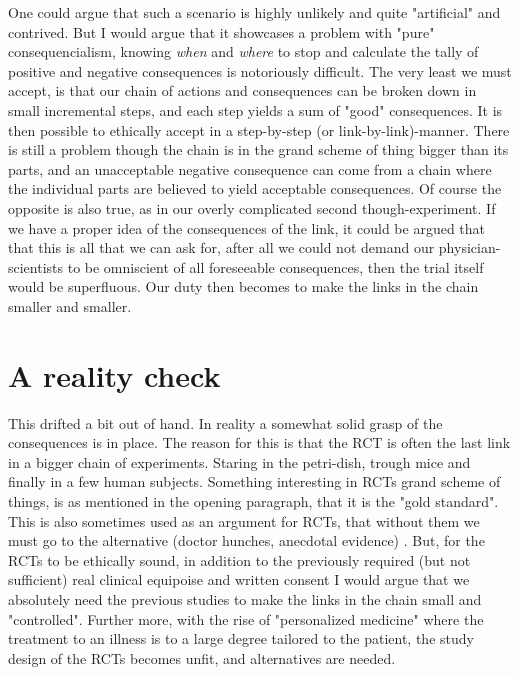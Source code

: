 \documentclass[12p]{article}
\begin{document}
One could argue that such a scenario is highly unlikely and quite "artificial" and contrived. %
But I would argue that it showcases a problem with "pure" consequencialism, knowing \emph{when} and \emph{where} to stop and calculate the tally of positive and negative consequences is notoriously difficult.
The very least we must accept, is that our chain of actions and consequences can be broken down in small incremental steps, and each step yields a sum of "good" consequences.
It is then possible to ethically accept in a step-by-step (or link-by-link)-manner.
There is still a problem though the chain is in the grand scheme of thing bigger than its parts, and an unacceptable  negative consequence can come from a chain where the individual parts are believed to yield acceptable consequences.
Of course the opposite is also true, as in our overly complicated second though-experiment.
If we have a proper idea of the consequences of the link, it could be argued that that this is all that we can ask for, after all we could not demand our physician-scientists to be omniscient of all foreseeable consequences, then the trial itself would be superfluous.
Our duty then becomes to make the links in the chain smaller and smaller.

\section*{A reality check}

This drifted a bit out of hand.
In reality a somewhat solid grasp of the consequences is in place.
The reason for this is that the RCT is often the last link in a bigger chain of experiments. 
Staring in the petri-dish, trough mice and finally in a few human subjects.
Something interesting in RCTs grand scheme of things, is as mentioned in the opening paragraph, that it is the "gold standard".
This is also sometimes used as an argument for RCTs, that without them we must go to the alternative (doctor hunches, anecdotal evidence) \cite{micenotmen}.
But, for the RCTs to be ethically sound, in addition to the previously required (but not sufficient) real clinical equipoise and written consent I would argue that we absolutely need the previous studies to make the links in the chain small and "controlled".
Further more, with the rise of "personalized medicine" where the treatment to an illness is to a large degree tailored to the patient, the study design of the RCTs becomes unfit, and alternatives are needed.
\end{document}
